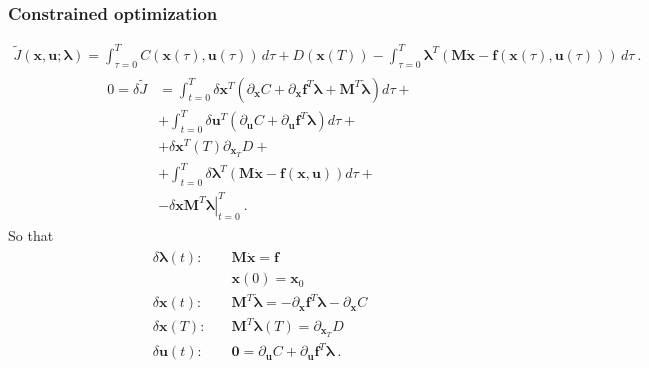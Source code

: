 \documentclass[letterpaper,10pt,english]{jupyterBook}
\begin{document}
\subsubsection*{Constrained optimization}
\begin{equation*}
\begin{split}\widetilde{J}(\mathbf{x},\mathbf{u}; \boldsymbol\lambda) = \int_{\tau=0}^{T} C\left( \mathbf{x}(\tau), \mathbf{u}(\tau) \right) \, d\tau + D\left( \mathbf{x}(T) \right) - \int_{\tau=0}^{T} \boldsymbol\lambda^T \left( \mathbf{M} \dot{\mathbf{x}} - \mathbf{f}(\mathbf{x}(\tau), \mathbf{u}(\tau)) \right) \, d \tau \ .\end{split}
\end{equation*}\begin{equation*}
\begin{split}\begin{aligned}
  0 = \delta \widetilde{J} 
  & = \int_{t=0}^{T} \delta \mathbf{x}^T \left( \partial_\mathbf{x} C + \partial_{\mathbf{x}} \mathbf{f}^T \boldsymbol\lambda + \mathbf{M}^T \dot{\boldsymbol{\lambda}}\right) d \tau + \\
  & + \int_{t=0}^{T} \delta \mathbf{u}^T \left( \partial_\mathbf{u} C + \partial_{\mathbf{u}} \mathbf{f}^T \boldsymbol\lambda \right) d \tau + \\
  & + \delta \mathbf{x}^T(T) \partial_{\mathbf{x}_T} D + \\
  & + \int_{t=0}^{T} \delta \boldsymbol\lambda^T ( \mathbf{M} \dot{\mathbf{x}} - \mathbf{f}(\mathbf{x}, \mathbf{u}) ) d \tau + \\
  & - \left. \delta \mathbf{x} \mathbf{M}^T \boldsymbol\lambda \right|_{t=0}^{T} \ .
\end{aligned}\end{split}
\end{equation*}
\sphinxAtStartPar
So that
\begin{equation}\label{equation:ch/control/optimal-control-full-state-general-ode:eq:optimal:ode}
\begin{split}\begin{aligned}
 \delta \boldsymbol\lambda(t): & \quad \mathbf{M}   \dot{\mathbf{x}} = \mathbf{f} \\
                               & \quad \mathbf{x}(0) = \mathbf{x}_0 \\
 \delta \mathbf{x}(t)        : & \quad \mathbf{M}^T \dot{\boldsymbol{\lambda}} = -\partial_{\mathbf{x}} \mathbf{f}^T \boldsymbol\lambda - \partial_{\mathbf{x}} C \\
 \delta \mathbf{x}(T)        : & \quad \mathbf{M}^T \boldsymbol\lambda(T) = \partial_{\mathbf{x}_T} D \\
 \delta \mathbf{u}(t)        : & \quad \mathbf{0} = \partial_\mathbf{u} C + \partial_\mathbf{u} \mathbf{f}^T \boldsymbol\lambda \ .
\end{aligned}\end{split}
\end{equation}
\end{document}

